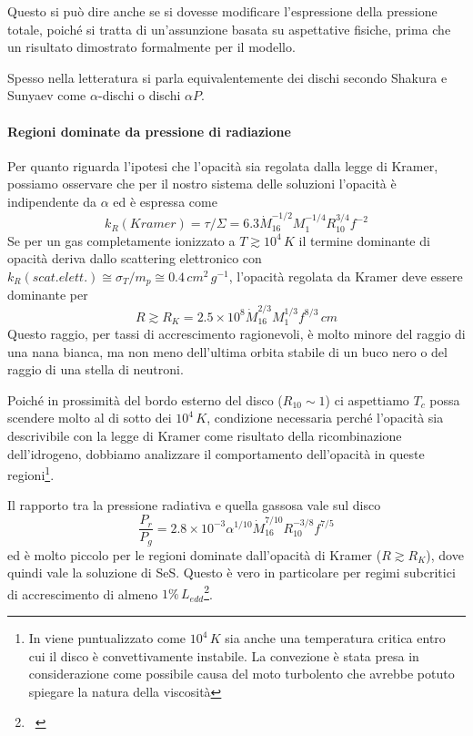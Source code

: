 \documentclass[a4paperbi]{article}
\begin{document}
	Questo si può dire anche se si dovesse modificare l'espressione della pressione totale, poiché si tratta di un'assunzione basata su aspettative fisiche, prima che un risultato dimostrato formalmente per il modello. 
	
	Spesso nella letteratura si parla equivalentemente dei dischi secondo Shakura e Sunyaev come $\alpha$-dischi o dischi $\alpha P$.
	
	\paragraph{Regioni dominate da pressione di radiazione}
	Per quanto riguarda l'ipotesi che l'opacità sia regolata dalla legge di Kramer, possiamo osservare che per il nostro sistema delle soluzioni l'opacità è indipendente da $\alpha$ ed è espressa come
	\begin{equation}
		k_R(Kramer)=\tau/\Sigma=6.3\dot{M}^{-1/2}_{16}M^{-1/4}_1R^{3/4}_{10}f^{-2}
	\end{equation}
	Se per un gas completamente ionizzato a $T\gtrsim10^4\,K$ il termine dominante di opacità deriva dallo scattering elettronico con $k_R(scat. elett.)\cong\sigma_T/m_p\cong0.4\,cm^2\,g^{-1}$, l'opacità regolata da Kramer deve essere dominante per	
	\begin{equation}
		R\gtrsim R_K=2.5\times10^8\dot{M}^{2/3}_{16}M^{1/3}_1f^{8/3}\,cm
	\end{equation}
	Questo raggio, per tassi di accrescimento ragionevoli, è molto minore del raggio di una nana bianca, ma non meno dell'ultima orbita stabile di un buco nero o del raggio di una stella di neutroni.
	
	Poiché in prossimità del bordo esterno del disco ($R_{10}\sim1$) ci aspettiamo $T_c$ possa scendere molto al di sotto dei $10^4\,K$, condizione necessaria perché l'opacità sia descrivibile con la legge di Kramer come risultato della ricombinazione dell'idrogeno, dobbiamo analizzare il comportamento dell'opacità in queste regioni\footnote{In \cite{Pringle1981} viene puntualizzato come $10^4\,K$ sia anche una temperatura critica entro cui il disco è convettivamente instabile. La convezione è stata presa in considerazione come possibile causa del moto turbolento che avrebbe potuto spiegare la natura della viscosità}.
	
	Il rapporto tra la pressione radiativa e quella gassosa vale sul disco
	\begin{equation}
		\frac{P_r}{P_g}=2.8\times10^{-3}\alpha^{1/10}\dot{M}^{7/10}_{16}R^{-3/8}_{10}f^{7/5}
	\end{equation}
ed è molto piccolo per le regioni dominate dall'opacità di Kramer ($R\gtrsim R_K$), dove quindi vale la soluzione di SeS. Questo è vero in particolare per regimi subcritici di accrescimento di almeno $1\%\,L_{edd}$\footnote{~\cite{ShakuraSunyaev1973}}.
	
\end{document}
